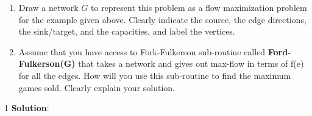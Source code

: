 \documentclass[9pt]{article}
\def\solutions{1}
\begin{document}
\begin{enumerate}
    \item Draw a network $G$ to represent this problem as a flow maximization problem for the example given above. Clearly indicate the source, the edge directions, the sink/target, and the capacities, and label the vertices.

    
    \item Assume that you have access to Fork-Fulkerson sub-routine called \textbf{Ford-Fulkerson(G)} that takes a network and gives out max-flow in terms of f(e) for all the edges. How will you use this sub-routine to find the maximum games sold. Clearly explain your solution.

\end{enumerate}

\if\solutions1
\vspace{3mm}
{\bf Solution}: \\
\end{document}
